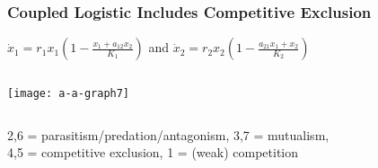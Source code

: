 \documentclass[dvipsnames]{beamer}
\begin{document}
\begin{frame}
\frametitle{Coupled Logistic Includes Competitive Exclusion}
\centering
$\dot{x}_1 = r_1 x_1 \left( 1 - \frac{x_1 + a_{12} x_2}{K_1} \right)$ and $\dot{x}_2 = r_2 x_2 \left( 1 - \frac{a_{21} x_1 + x_2}{K_2} \right)$
\begin{columns}
	\begin{column}{5cm}
		\begin{center}
			\texttt{[image: a-a-graph7]}
		\end{center}
	\end{column}
\end{columns}
\footnotesize{
	2,6 = parasitism/predation/antagonism, 3,7 = mutualism, \\
	4,5 = competitive exclusion, 1 = (weak) competition
}
\end{frame}
\end{document}
